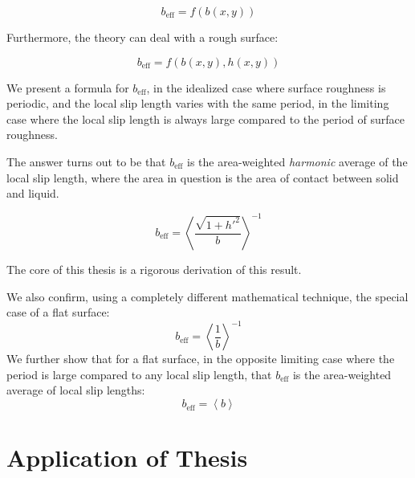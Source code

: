 \documentclass[12pt, a4paper, twoside, openright]{book}
\newcommand{\beff}{\ensuremath{b_{\mathrm{eff}}}}
\begin{document}
\begin{equation}
b_{\mathrm{eff}} = f(b(x,y))
\end{equation}

Furthermore, the theory can deal with a rough surface:

\begin{equation}
\beff = f(b(x,y),h(x,y))
\end{equation}

We present a formula for $\beff$, in the idealized case where surface roughness is periodic, and the local slip length varies with the same period, in the limiting case where the local slip length is always large compared to the period of surface roughness.

The answer turns out to be that $\beff$ is the area-weighted \emph{harmonic} average of the local slip length, where the area in question is the area of contact between solid and liquid.


\begin{equation}
\beff = \left< \frac{\sqrt{1+h'^{2}}}{b}  \right > ^{-1}
\end{equation}

The core of this thesis is a rigorous derivation of this result.

\vspace*{1em}
We also confirm, using a completely different mathematical technique, the special case of a flat surface:
\begin{equation}
\beff = \left< \frac{1}{b}  \right > ^{-1}
\end{equation}
We further show that for a flat surface, in the opposite limiting case where the period is large compared to any local slip length, that $\beff$ is the area-weighted average of local slip lengths:
\begin{equation}
\beff = \left< b  \right >
\end{equation}


\section{Application of Thesis}

\end{document}
